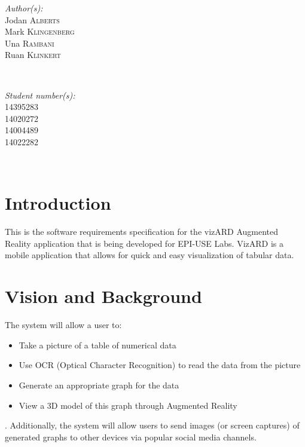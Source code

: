 \documentclass[a4paper,12pt]{article}
\begin{document}
\begin{titlepage}
\begin{minipage}{0.4\textwidth}
\begin{flushleft} \large
\emph{Author(s):}\\
Jodan \textsc{Alberts}\\ %
Mark \textsc{Klingenberg}\\
Una \textsc{Rambani}\\
Ruan \textsc{Klinkert}\\
\end{flushleft}
\end{minipage}
~
\begin{minipage}{0.4\textwidth}
\begin{flushright} \large
\emph{Student number(s):} \\
14395283\\ %
14020272\\
14004489\\
14022282\\

\end{flushright}
\end{minipage}\\[4cm]


 

\vfill %

\end{titlepage}

\newpage

\tableofcontents

\newpage

\section{Introduction}

This is the software requirements specification for the vizARD Augmented Reality application that is being developed for EPI-USE Labs.
\newline
VizARD is a mobile application that allows for quick and easy visualization of tabular data.

\section{Vision and Background}
The system will allow a user to:
\begin{itemize}
\item Take a picture of a table of numerical data
\item Use OCR (Optical Character Recognition) to read the data from the picture
\item Generate an appropriate graph for the data
\item View a 3D model of this graph through Augmented Reality
\end{itemize}   . 
\newline
Additionally, the system will allow users to send images (or screen captures) of generated graphs to other devices via popular social media channels.
\end{document}
